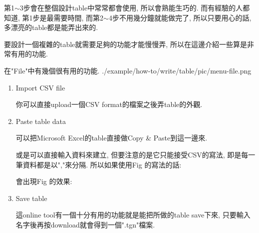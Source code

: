   第1$\sim$3步會在整個設計table中常常都會使用, 所以會熟能生巧的. 而有經驗的人都知道, 第1步是最需要時間, 而第2$\sim$4步不用幾分鐘就能做完了, 所以只要用心的話, 多漂亮的table都是能弄出來的.

\newpage
{}

要設計一個複雜的table就需要足夠的功能才能慢慢弄, 所以在這邊介紹一些算是非常有用的功能.


  在"File"中有幾個很有用的功能.
  \InsertCenterImage
    {./example/how-to/write/table/pic/menu-file.png}

  \begin{enumerate}

  \item
  {
    Import CSV file

    你可以直接upload一個CSV format的檔案之後弄table的外觀.
  } %

  \newpage
  \item
  {
    Paste table data

    可以把Microsoft Excel的table直接做Copy \& Paste到這一邊來.

    或是可以直接輸入資料來建立, 但要注意的是它只能接受CSV的寫法, 即是每一筆資料都是以","來分隔. 所以如果使用Fig 的寫法的話:

    會出現Fig 的效果:

  } %

  \newpage
  \item
  {
    Save table

    這online tool有一個十分有用的功能就是能把所做的table save下來, 只要輸入名字後再按download就會得到一個".tgn"檔案.

}
\end{enumerate}
